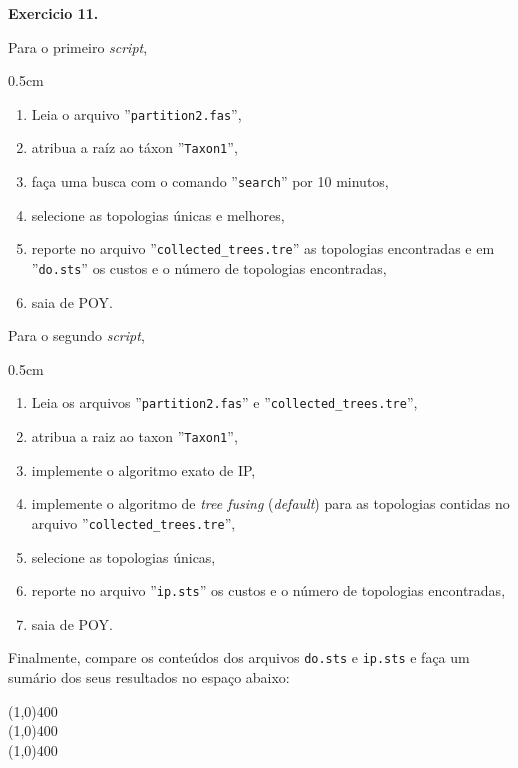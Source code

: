 \begin{refsection}
\begin{blackBlock}{\textbf{Exercicio 11.}}
\end{blackBlock}


Para o primeiro \textit{script},

\begin {myindentpar}{0.5cm}
\begin{enumerate}[\itshape 1.]

	\item{Leia o arquivo ''\texttt{partition2.fas}'',}
	\item{atribua a raíz ao  táxon ''\texttt{Taxon1}'',}
	\item{faça uma busca com o comando ''\texttt{search}'' por 10 minutos,}
	\item{selecione as topologias únicas e melhores,}
	\item{reporte no arquivo ''\texttt{collected\_trees.tre}'' as topologias encontradas e em ''\texttt{do.sts}'' os custos e o número de topologias encontradas,}
	\item{saia de POY.}

\end{enumerate}
\end{myindentpar}

Para o segundo \textit{script},

\begin {myindentpar}{0.5cm}
\begin{enumerate}[\itshape 1.]
	\item{Leia os arquivos ''\texttt{partition2.fas}'' e ''\texttt{collected\_trees.tre}'',}
	\item{atribua a raiz ao  taxon ''\texttt{Taxon1}'',}
	\item{implemente o algoritmo exato de IP,}
	\item{implemente o algoritmo de \textit{tree fusing} (\textit{default}) para as topologias contidas no arquivo ''\texttt{collected\_trees.tre}'',}
	\item{selecione as topologias únicas,}
	\item{reporte no arquivo ''\texttt{ip.sts}'' os custos e o número de topologias encontradas,}
	\item{saia de POY.}

\end{enumerate}
\end{myindentpar}

Finalmente, compare os conteúdos dos arquivos \texttt{do.sts} e \texttt{ip.sts} e faça um sumário dos seus resultados no espaço abaixo:

\begin{center}
\line(1,0){400}\\
\line(1,0){400}\\
\line(1,0){400}\\
\end{center}


\end{refsection}
